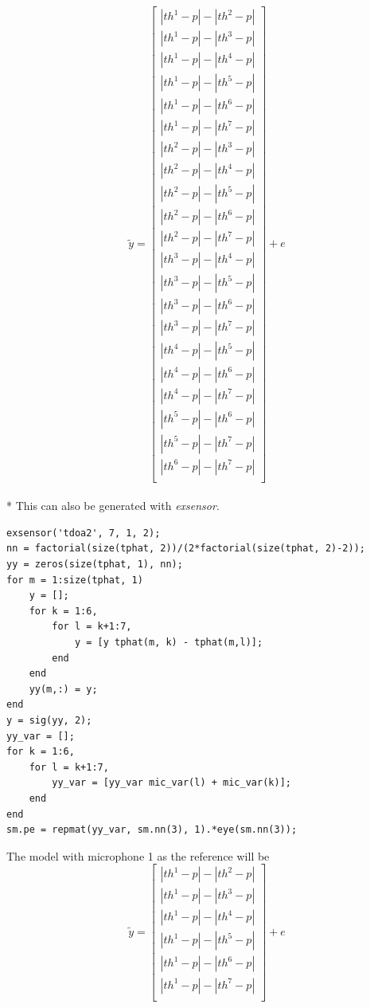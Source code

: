 \documentclass[10pt,a4paper]{report}
\begin{document}
\[
  \tilde{y} = 
  \begin{bmatrix}
    |th^1 - p| - |th^2 - p| \\
    |th^1 - p| - |th^3 - p| \\
    |th^1 - p| - |th^4 - p| \\
    |th^1 - p| - |th^5 - p| \\
    |th^1 - p| - |th^6 - p| \\
    |th^1 - p| - |th^7 - p| \\
    |th^2 - p| - |th^3 - p| \\
    |th^2 - p| - |th^4 - p| \\
    |th^2 - p| - |th^5 - p| \\
    |th^2 - p| - |th^6 - p| \\
    |th^2 - p| - |th^7 - p| \\
    |th^3 - p| - |th^4 - p| \\
    |th^3 - p| - |th^5 - p| \\
    |th^3 - p| - |th^6 - p| \\
    |th^3 - p| - |th^7 - p| \\
    |th^4 - p| - |th^5 - p| \\
    |th^4 - p| - |th^6 - p| \\
    |th^4 - p| - |th^7 - p| \\
    |th^5 - p| - |th^6 - p| \\
    |th^5 - p| - |th^7 - p| \\
    |th^6 - p| - |th^7 - p| \\
  \end{bmatrix} + e
\]
\\*
This can also be generated with \emph{exsensor}.
\begin{verbatim}
exsensor('tdoa2', 7, 1, 2);
nn = factorial(size(tphat, 2))/(2*factorial(size(tphat, 2)-2));
yy = zeros(size(tphat, 1), nn);
for m = 1:size(tphat, 1)
    y = [];
    for k = 1:6,
        for l = k+1:7,
            y = [y tphat(m, k) - tphat(m,l)];
        end
    end
    yy(m,:) = y;
end
y = sig(yy, 2);
yy_var = [];
for k = 1:6,
    for l = k+1:7,
        yy_var = [yy_var mic_var(l) + mic_var(k)];
    end
end
sm.pe = repmat(yy_var, sm.nn(3), 1).*eye(sm.nn(3));
\end{verbatim}
The model with microphone 1 as the reference will be
\[
  \tilde{y} = 
  \begin{bmatrix}
    |th^1 - p| - |th^2 - p| \\
    |th^1 - p| - |th^3 - p| \\
    |th^1 - p| - |th^4 - p| \\
    |th^1 - p| - |th^5 - p| \\
    |th^1 - p| - |th^6 - p| \\
    |th^1 - p| - |th^7 - p| \\
  \end{bmatrix} + e
\]
\end{document}
